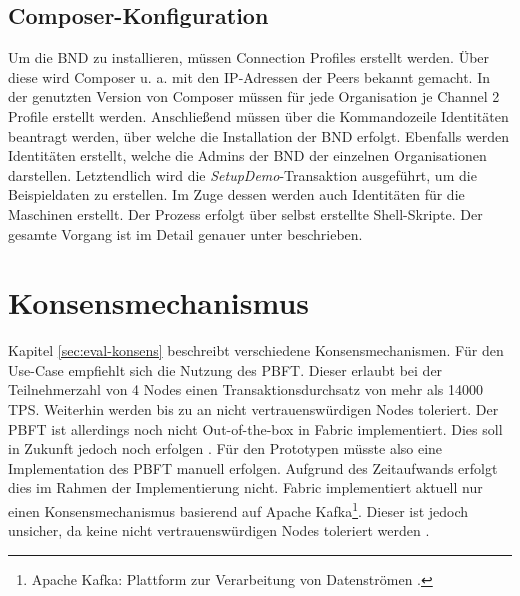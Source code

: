 \subsection{Composer-Konfiguration}
Um die \acs{BND} zu installieren, müssen Connection Profiles erstellt werden. Über diese wird Composer u. a. mit den IP-Adressen der Peers bekannt gemacht. In der genutzten Version von Composer müssen für jede Organisation je Channel 2 Profile erstellt werden. Anschließend müssen über die Kommandozeile Identitäten beantragt werden, über welche die Installation der \acs{BND} erfolgt. Ebenfalls werden Identitäten erstellt, welche die Admins der \acs{BND} der einzelnen Organisationen darstellen. Letztendlich wird die \textit{SetupDemo}-Transaktion ausgeführt, um die Beispieldaten zu erstellen. Im Zuge dessen werden auch Identitäten für die Maschinen erstellt. Der Prozess erfolgt über selbst erstellte Shell-Skripte. Der gesamte Vorgang ist im Detail genauer unter \cite{HyperledgerComposerTeamMultiOrgDeployment} beschrieben.

\section{Konsensmechanismus}
\label{sec:consensus-choose}
Kapitel \ref{sec:eval-konsens} beschreibt verschiedene Konsensmechanismen. Für den Use-Case empfiehlt sich die Nutzung des \acs{PBFT}. Dieser erlaubt bei der Teilnehmerzahl von 4 Nodes einen Transaktionsdurchsatz von mehr als 14000 \acs{TPS}. Weiterhin werden bis zu  an nicht vertrauenswürdigen Nodes toleriert. Der \acs{PBFT} ist allerdings noch nicht Out-of-the-box in Fabric implementiert. Dies soll in Zukunft jedoch noch erfolgen \cite{HyperledgerFabricTeamPluggableConsensusImplementations}. Für den Prototypen müsste also eine Implementation des \acs{PBFT} manuell erfolgen. Aufgrund des Zeitaufwands erfolgt dies im Rahmen der Implementierung nicht. Fabric implementiert aktuell nur einen Konsensmechanismus basierend auf Apache Kafka\footnote{Apache Kafka: Plattform zur Verarbeitung von Datenströmen \cite{ApacheIntroductionApacheKafka}.}. Dieser ist jedoch unsicher, da keine nicht vertrauenswürdigen Nodes toleriert werden \cite{CachinBlockchainConsensusProtocols2017}.

